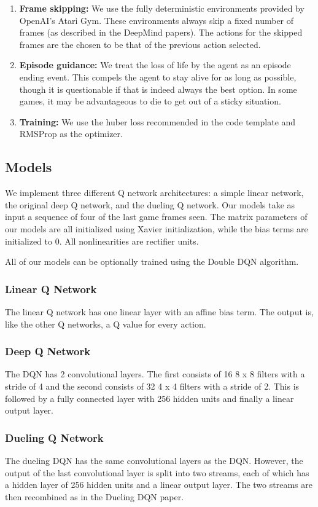 \documentclass[letterpaper]{article}
\begin{document}
\begin{enumerate}
  \item \textbf{Frame skipping:} We use the fully deterministic environments provided by OpenAI's Atari Gym. These environments always skip a fixed number of frames (as described in the DeepMind papers). The actions for the skipped frames are the chosen to be that of the previous action selected.
  \item \textbf{Episode guidance:} We treat the loss of life by the agent as an episode ending event. This compels the agent to stay alive for as long as possible, though it is questionable if that is indeed always the best option. In some games, it may be advantageous to die to get out of a sticky situation.
  \item \textbf{Training:} We use the huber loss recommended in the code template and RMSProp as the optimizer.
\end{enumerate}

\subsection{Models}
We implement three different Q network architectures: a simple linear network, the original deep Q network, and the dueling Q network. Our models take as input a sequence of four of the last game frames seen. The matrix parameters of our models are all initialized using Xavier initialization, while the bias terms are initialized to 0. All nonlinearities are rectifier units.

All of our models can be optionally trained using the Double DQN algorithm.
\subsubsection{Linear Q Network}
The linear Q network has one linear layer with an affine bias term. The output is, like the other Q networks, a Q value for every action.
\subsubsection{Deep Q Network}
The DQN has 2 convolutional layers. The first consists of 16 8 x 8 filters with a stride of 4 and the second consists of 32 4 x 4 filters with a stride of 2. This is followed by a fully connected layer with 256 hidden units and finally a linear output layer.
\subsubsection{Dueling Q Network}
The dueling DQN has the same convolutional layers as the DQN. However, the output of the last convolutional layer is split into two streams, each of which has a hidden layer of 256 hidden units and a linear output layer. The two streams are then recombined as in the Dueling DQN paper.
\end{document}
